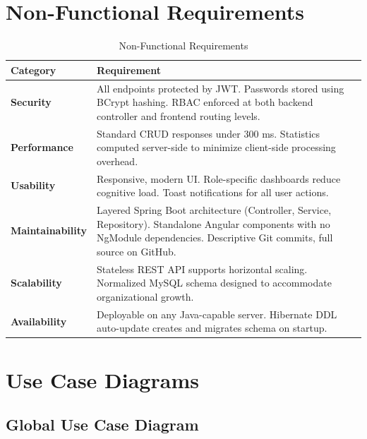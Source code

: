 \documentclass[12pt,a4paper]{report}
\begin{document}
\section{Non-Functional Requirements}

\begin{table}[H]
\centering
\caption{Non-Functional Requirements}
\label{tab:nfr}
\begin{tabular}{|C{3cm}|L{10cm}|}
\hline
{}
\textbf{Category} & \textbf{Requirement} \\
\hline
\textbf{Security} &
  All endpoints protected by JWT. Passwords stored using BCrypt hashing.
  RBAC enforced at both backend controller and frontend routing levels. \\
\hline
\textbf{Performance} &
  Standard CRUD responses under 300 ms. Statistics computed server-side
  to minimize client-side processing overhead. \\
\hline
\textbf{Usability} &
  Responsive, modern UI. Role-specific dashboards reduce cognitive load.
  Toast notifications for all user actions. \\
\hline
\textbf{Maintainability} &
  Layered Spring Boot architecture (Controller, Service, Repository).
  Standalone Angular components with no NgModule dependencies.
  Descriptive Git commits, full source on GitHub. \\
\hline
\textbf{Scalability} &
  Stateless REST API supports horizontal scaling.
  Normalized MySQL schema designed to accommodate organizational growth. \\
\hline
\textbf{Availability} &
  Deployable on any Java-capable server.
  Hibernate DDL auto-update creates and migrates schema on startup. \\
\hline
\end{tabular}
\end{table}

\section{Use Case Diagrams}

\subsection{Global Use Case Diagram}
\end{document}
